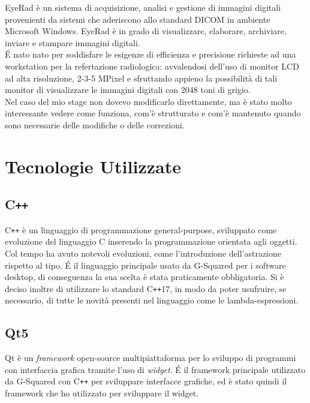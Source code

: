 EyeRad è un sistema di acquisizione, analisi e gestione di immagini digitali provenienti da sistemi che aderiscono allo standard DICOM in ambiente Microsoft Windows.
EyeRad è in grado di visualizzare, elaborare, archiviare, inviare e stampare immagini digitali.
\\
\'E nato nato per soddisfare le esigenze di efficienza e precisione richieste ad una workstation per la refertazione radiologica: avvalendosi dell’uso di monitor LCD ad alta risoluzione, 2-3-5 MPixel e sfruttando appieno la possibilità di tali monitor di visualizzare le immagini digitali con 2048 toni di grigio.
\\
Nel caso del mio stage non dovevo modificarlo direttamente, ma è stato molto interessante vedere come funziona, com'è strutturato e com'è mantenuto quando sono necessarie delle modifiche o delle correzioni.

\section{Tecnologie Utilizzate}
\subsection{C\texttt{++}}\label{sec:C++}
C\texttt{++} è un linguaggio di programmazione general-purpose, sviluppato come evoluzione del linguaggio C inserendo la programmazione orientata agli oggetti. Col tempo ha avuto notevoli evoluzioni, come l'introduzione dell'astrazione rispetto al tipo. \'E il linguaggio principale usato da G-Squared per i software desktop, di conseguenza la sua scelta è stata praticamente obbligatoria. Si è deciso inoltre di utilizzare lo standard C\texttt{++}17, in modo da poter usufruire, se necessario, di tutte le novità presenti nel linguaggio come le lambda-espressioni.

\subsection{Qt5}\label{sec:Qt5}
Qt è un \textit{framework} open-source multipiattaforma per lo sviluppo di programmi con interfaccia grafica tramite l'uso di \textit{widget}.
\'E il framework principale utilizzato da G-Squared con C\texttt{++} per sviluppare interfacce grafiche, ed è stato quindi il framework che ho utilizzato per sviluppare il widget.

\newpage
